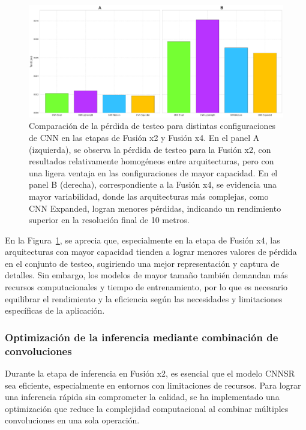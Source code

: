             \begin{figure}[H]
                \centering
                \includegraphics[width=1\linewidth]{images/fusionx2x4_loss_test.png}
                \caption{Comparación de la pérdida de testeo para distintas configuraciones de CNN en las etapas de Fusión x2 y Fusión x4. En el panel A (izquierda), se observa la pérdida de testeo para la Fusión x2, con resultados relativamente homogéneos entre arquitecturas, pero con una ligera ventaja en las configuraciones de mayor capacidad. En el panel B (derecha), correspondiente a la Fusión x4, se evidencia una mayor variabilidad, donde las arquitecturas más complejas, como CNN Expanded, logran menores pérdidas, indicando un rendimiento superior en la resolución final de 10 metros.}
                \label{fig:fusionx2x4_loss_test}
            \end{figure}

            En la Figura~\ref{fig:fusionx2x4_loss_test}, se aprecia que, especialmente en la etapa de Fusión x4, las arquitecturas con mayor capacidad tienden a lograr menores valores de pérdida en el conjunto de testeo, sugiriendo una mejor representación y captura de detalles. Sin embargo, los modelos de mayor tamaño también demandan más recursos computacionales y tiempo de entrenamiento, por lo que es necesario equilibrar el rendimiento y la eficiencia según las necesidades y limitaciones específicas de la aplicación.

        \subsubsection{Optimización de la inferencia mediante combinación de convoluciones}

            Durante la etapa de inferencia en Fusión x2, es esencial que el modelo CNNSR sea eficiente, especialmente en entornos con limitaciones de recursos. Para lograr una inferencia rápida sin comprometer la calidad, se ha implementado una optimización que reduce la complejidad computacional al combinar múltiples convoluciones en una sola operación.

